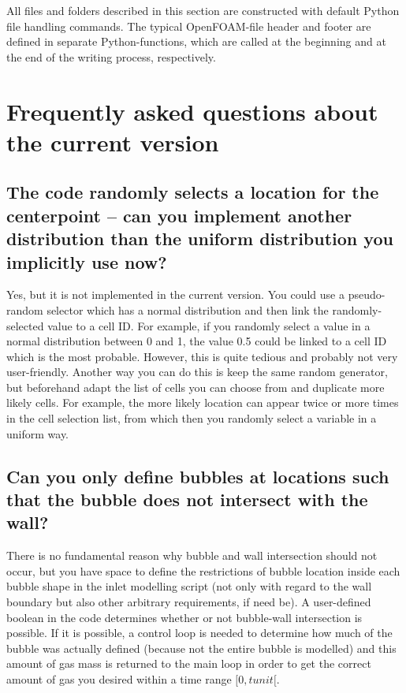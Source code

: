 \documentclass[fleqn,10pt,a4paper,twoside,english]{book}
\begin{document}
\par All files and folders described in this section are constructed with default Python file handling commands. The typical OpenFOAM-file header and footer are defined in separate Python-functions, which are called at the beginning and at the end of the writing process, respectively.
\section{Frequently asked questions about the current version}
\subsection{The code randomly selects a location for the centerpoint – can you implement another distribution than the uniform distribution you implicitly use now?}
Yes, but it is not implemented in the current version. You could use a pseudo-random selector which has a normal distribution and then link the randomly-selected value to a cell ID. For example, if you randomly select a value in a normal distribution between 0 and 1, the value 0.5 could be linked to a cell ID which is the most probable. However, this is quite tedious and probably not very user-friendly. Another way you can do this is keep the same random generator, but beforehand adapt the list of cells you can choose from and duplicate more likely cells. For example, the more likely location can appear twice or more times in the cell selection list, from which then you randomly select a variable in a uniform way. 
\subsection{Can you only define bubbles at locations such that the bubble does not intersect with the wall?}
There is no fundamental reason why bubble and wall intersection should not occur, but you have space to define the restrictions of bubble location inside each bubble shape in the inlet modelling script (not only with regard to the wall boundary but also other arbitrary requirements, if need be). A user-defined boolean in the code determines whether or not bubble-wall intersection is possible. If it is possible, a control loop is needed to determine how much of the bubble was actually defined (because not the entire bubble is modelled) and this amount of gas mass is returned to the main loop in order to get the correct amount of gas you desired within a time range $[0, tunit[$.
\end{document}
